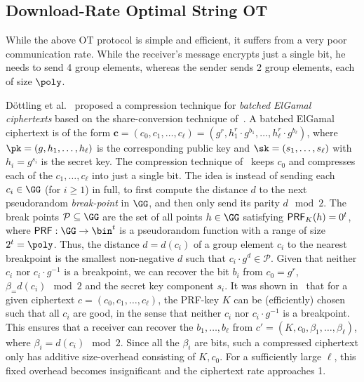 \subsection{Download-Rate Optimal String OT}
While the above OT protocol is simple and efficient, it suffers from a very poor communication rate. While the receiver's message encrypts just a single bit, he needs to send 4 group elements, whereas the sender sends 2 group elements, each of size $\poly$.

Döttling et al.~\cite{C:DGIMMO19} proposed a compression technique for \emph{batched ElGamal ciphertexts} based on the share-conversion technique of~\cite{C:BoyGilIsh16}. A batched ElGamal ciphertext is of the form $\mathbf{c} = (c_0,c_1,\dots,c_\ell) = (g^r,h_1^r \cdot g^{b_1},\dots,h_\ell^r \cdot g^{b_\ell})$, where $\pk = (g,h_1,\dots,h_\ell)$ is the corresponding public key and $\sk = (s_1,\dots,s_\ell)$ with $h_i = g^{s_i}$ is the secret key. The compression technique of~\cite{C:DGIMMO19} keeps $c_0$ and compresses each of the $c_1,\dots,c_\ell$ into just a single bit. The idea is instead of sending each $c_i \in \GG$ (for $i \geq 1$) in full, to first compute the distance $d$ to the next pseudorandom \emph{break-point} in $\GG$, and then only send its parity $d \mod 2$. The break points $\mathcal{P} \subseteq \GG$ are the set of all points $h \in \GG$ satisfying $\mathsf{PRF}_K(h) = 0^t$, where $\PRF: \GG \to \bin^t$ is a pseudorandom function with a range of size $2^t = \poly$. Thus, the distance $d = d(c_i)$ of a group element $c_i$ to the nearest breakpoint is the smallest non-negative $d$ such that $c_i \cdot g^d \in \mathcal{P}$. Given that neither $c_i$ nor $c_i \cdot g^{-1}$ is a breakpoint, we can recover the bit $b_i$ from $c_0 = g^r$, $\beta_ =  d(c_i) \mod 2$ and the secret key component $s_i$. It was shown in~\cite{TCC:BBDGM20} that for a given ciphertext $c = (c_0,c_1,\dots,c_\ell)$, the PRF-key $K$ can be (efficiently) chosen such that all $c_i$ are good, in the sense that neither $c_i$ nor $c_i \cdot g^{-1}$ is a breakpoint. This ensures that a receiver can recover the $b_1,\dots,b_\ell$ from $c' = (K,c_0,\beta_1,\dots,\beta_\ell)$, where $\beta_i = d(c_i) \mod 2$. Since all the $\beta_i$ are bits, such a compressed ciphertext only has additive size-overhead consisting of $K,c_0$. For a sufficiently large $\ell$, this fixed overhead becomes insignificant and the ciphertext rate approaches 1.

